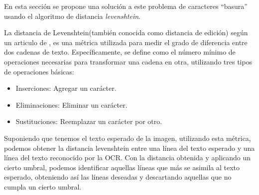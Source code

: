 En esta sección se propone una solución a este problema de caracteres ``basura'' usando el algoritmo de distancia \emph{levenshtein}.

La distancia de Levenshtein(también conocida como distancia de edición) según un articulo de \cite{LevDistance}, es una métrica utilizada para medir el grado de diferencia entre dos cadenas de texto. Específicamente, se define como el número mínimo de operaciones necesarias para transformar una cadena en otra, utilizando tres tipos de operaciones básicas:
\begin{itemize}
\item Inserciones: Agregar un carácter.
\item Eliminaciones: Eliminar un carácter.
\item Sustituciones: Reemplazar un carácter por otro.
\end{itemize}

Suponiendo que tenemos el texto esperado de la imagen,  utilizando esta métrica, podemos obtener la distancia levenshtein entre una línea del texto esperado y una línea del texto reconocido por la OCR. Con la distancia obtenida y aplicando un cierto umbral, podemos identificar aquellas líneas que más se asimila al texto esperado, obteniendo así las líneas deseadas y descartando aquellas que no cumpla un cierto umbral.

